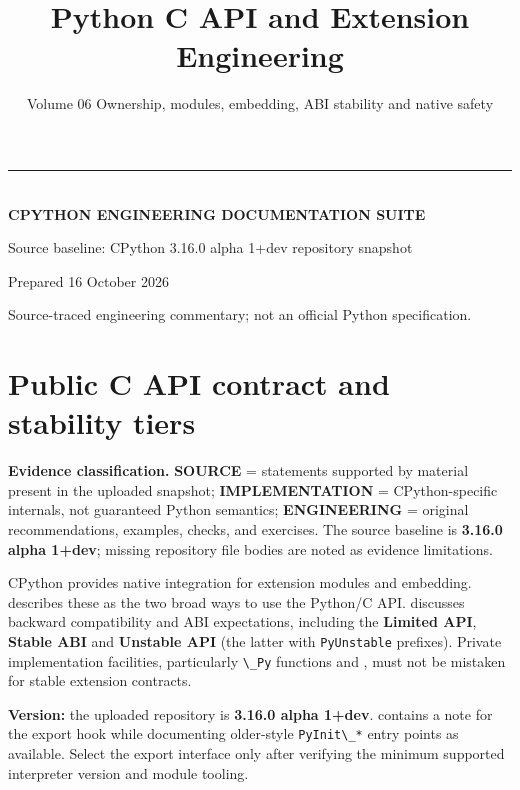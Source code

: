 \documentclass[
  11pt,
]{report}
\title{Python C API and Extension Engineering}
\subtitle{Volume 06 \textbar{} Ownership, modules, embedding, ABI
stability and native safety}
\author{}
\date{}
\makeatletter
\newcommand{\passthrough}[1]{#1}
\renewcommand{\maketitle}{%
  \hypersetup{pageanchor=false}%
\begin{titlepage}\pagecolor{CPNavy}\color{white}\sffamily
  \vspace*{0.8in}
  {\color{CPGold}\rule{2.1in}{4pt}}\\[16pt]
  {\Large\bfseries CPYTHON ENGINEERING DOCUMENTATION SUITE}\\[24pt]
  {\Huge\bfseries \@title\par}\vspace{19pt}
  \vfill
  {\normalsize Source baseline: CPython 3.16.0 alpha 1+dev repository snapshot}\par
  {\normalsize Prepared 16 October 2026}\par
  {\small\color{white!70} Source-traced engineering commentary; not an official Python specification.}\vspace{0.65in}
  \end{titlepage}\hypersetup{pageanchor=true}\nopagecolor\color{black}
  }
\makeatother
\begin{document}
\maketitle

{
\setcounter{tocdepth}{1}
\tableofcontents
}
\chapter{Public C API contract and stability
tiers}\label{public-c-api-contract-and-stability-tiers}

\begin{sourcebox}
\textbf{Evidence classification.} \textbf{SOURCE} = statements supported by material present in the uploaded snapshot; \textbf{IMPLEMENTATION} = CPython-specific internals, not guaranteed Python semantics; \textbf{ENGINEERING} = original recommendations, examples, checks, and exercises. The source baseline is \textbf{3.16.0 alpha 1+dev}; missing repository file bodies are noted as evidence limitations.
\end{sourcebox}

CPython provides native integration for extension modules and embedding.
 describes these as the two
broad ways to use the Python/C API.
 discusses backward
compatibility and ABI expectations, including the \textbf{Limited API},
\textbf{Stable ABI} and \textbf{Unstable API} (the latter with
\passthrough{\lstinline!PyUnstable!} prefixes). Private implementation
facilities, particularly \passthrough{\lstinline!\_Py!} functions and
, must not be mistaken for
stable extension contracts.

\textbf{Version:} the uploaded repository is \textbf{3.16.0 alpha
1+dev}. 
contains a  note for the
 export hook while documenting
older-style \passthrough{\lstinline!PyInit\_*!} entry points as
available. Select the export interface only after verifying the minimum
supported interpreter version and module tooling.
\end{document}

